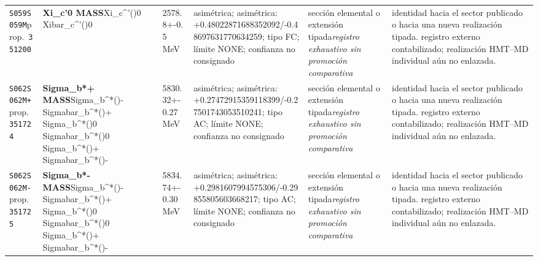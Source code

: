 \begin{landscape}
\begin{longtable}{L{1.85cm}L{4.45cm}L{2.35cm}L{4.05cm}L{3.35cm}L{7.15cm}}
\texttt{S059}\newline \texttt{S059M}\newline prop.\ \texttt{351200} & \textbf{Xi\_\allowbreak{}c'0 MASS}\newline Xi\_\allowbreak{}c\textasciicircum{}'()0 \textbar{}\allowbreak{} Xibar\_\allowbreak{}c\textasciicircum{}'()0 & 2578.8+-0.5\,MeV & asimétrica; asimétrica: +0.48022871688352092/-0.48697631770634259; tipo FC; límite NONE; confianza no consignado & sección elemental o extensión tipada\newline \emph{registro exhaustivo sin promoción comparativa} & identidad hacia el sector publicado o hacia una nueva realización tipada. registro externo contabilizado; realización HMT--MD individual aún no enlazada. \\
\texttt{S062}\newline \texttt{S062M+}\newline prop.\ \texttt{351724} & \textbf{Sigma\_\allowbreak{}b*+ MASS}\newline Sigma\_\allowbreak{}b\textasciicircum{}*()- \textbar{}\allowbreak{} Sigmabar\_\allowbreak{}b\textasciicircum{}*()+ \textbar{}\allowbreak{} Sigma\_\allowbreak{}b\textasciicircum{}*()0 \textbar{}\allowbreak{} Sigmabar\_\allowbreak{}b\textasciicircum{}*()0 \textbar{}\allowbreak{} Sigma\_\allowbreak{}b\textasciicircum{}*()+ \textbar{}\allowbreak{} Sigmabar\_\allowbreak{}b\textasciicircum{}*()- & 5830.32+-0.27\,MeV & asimétrica; asimétrica: +0.27472915359118399/-0.27501743053510241; tipo AC; límite NONE; confianza no consignado & sección elemental o extensión tipada\newline \emph{registro exhaustivo sin promoción comparativa} & identidad hacia el sector publicado o hacia una nueva realización tipada. registro externo contabilizado; realización HMT--MD individual aún no enlazada. \\
\texttt{S062}\newline \texttt{S062M-}\newline prop.\ \texttt{351725} & \textbf{Sigma\_\allowbreak{}b*- MASS}\newline Sigma\_\allowbreak{}b\textasciicircum{}*()- \textbar{}\allowbreak{} Sigmabar\_\allowbreak{}b\textasciicircum{}*()+ \textbar{}\allowbreak{} Sigma\_\allowbreak{}b\textasciicircum{}*()0 \textbar{}\allowbreak{} Sigmabar\_\allowbreak{}b\textasciicircum{}*()0 \textbar{}\allowbreak{} Sigma\_\allowbreak{}b\textasciicircum{}*()+ \textbar{}\allowbreak{} Sigmabar\_\allowbreak{}b\textasciicircum{}*()- & 5834.74+-0.30\,MeV & asimétrica; asimétrica: +0.2981607994575306/-0.29855805603668217; tipo AC; límite NONE; confianza no consignado & sección elemental o extensión tipada\newline \emph{registro exhaustivo sin promoción comparativa} & identidad hacia el sector publicado o hacia una nueva realización tipada. registro externo contabilizado; realización HMT--MD individual aún no enlazada. \\

\end{longtable}
\end{landscape}
